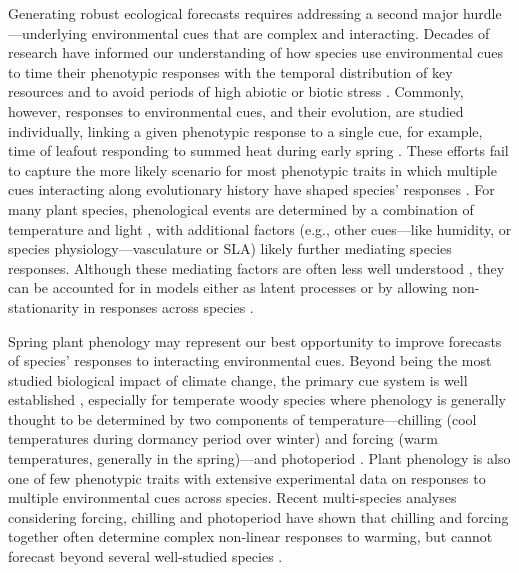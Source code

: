 \documentclass[11pt]{article}
\begin{document}
Generating robust ecological forecasts requires addressing a second major hurdle---underlying environmental cues that are complex and interacting. Decades of research have informed our understanding of how species use environmental cues to time their phenotypic responses with the temporal distribution of key resources and to avoid periods of high abiotic or biotic stress \citep{larcher1980,bonamour2019}. Commonly, however, responses to environmental cues, and their evolution, are studied individually, linking a given phenotypic response to a single cue, for example, time of leafout responding to summed heat during early spring \citep{davies2013phylogenetic}. These efforts fail to capture the more likely scenario for most phenotypic traits in which multiple cues interacting along evolutionary history have shaped species' responses \citep{Ackerly:2009ly}. For many plant species, phenological events are determined by a combination of temperature and light \citep{chuinearees}, with additional factors (e.g., other cues---like humidity, or species physiology---vasculature or SLA) likely further mediating species responses. Although these mediating factors are often less well understood \citep{chuinearees}, they can be accounted for in models either as latent processes or by allowing non-stationarity in responses across species \citep{davies2019phylogenetically}.  

Spring plant phenology may represent our best opportunity to improve forecasts of species' responses to interacting environmental cues. Beyond being the most studied biological impact of climate change, the primary cue system is well established \citep{chuinearees}, especially for temperate woody species where phenology is generally thought to be determined by two components of temperature---chilling (cool temperatures during dormancy period over winter) and forcing (warm temperatures, generally in the spring)---and photoperiod \citep{ospreephoto}. Plant phenology is also one of few phenotypic traits with extensive experimental data on responses to multiple environmental cues across species. Recent multi-species analyses considering forcing, chilling and photoperiod have shown that chilling and forcing together often determine complex non-linear responses to warming, but cannot forecast beyond several well-studied species \citep{ettinger2020}. %
\end{document}
